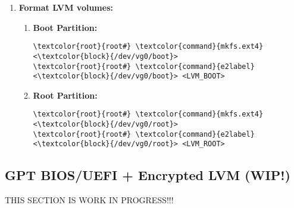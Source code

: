 \documentclass[10pt, a4paper, onecolumn, openany]{book} %
\begin{document}
\begin{enumerate}
\begin{enumerate}
    \item \textbf{Show LVM stuff:}
    \begin{itemize}
        \item \textbf{Physical Volumes:}
\begin{Verbatim}[commandchars=\\\{\}]
\textcolor{root}{root#} \textcolor{command}{lvm} pvdisplay
\end{Verbatim}            
        \item \textbf{Volume Groups:}
\begin{Verbatim}[commandchars=\\\{\}]
\textcolor{root}{root#} \textcolor{command}{lvm} vgdisplay [vg0]
\end{Verbatim}         
        \item \textbf{Logical Volumes:}
\begin{Verbatim}[commandchars=\\\{\}]
\textcolor{root}{root#} \textcolor{command}{lvm} lvdisplay
\end{Verbatim}       
        \end{itemize}
    \end{enumerate}

    \item \textbf{Format LVM volumes:}
    \begin{enumerate}
        \item \textbf{Boot Partition:}
\begin{Verbatim}[commandchars=\\\{\}]
\textcolor{root}{root#} \textcolor{command}{mkfs.ext4} <\textcolor{block}{/dev/vg0/boot}>
\textcolor{root}{root#} \textcolor{command}{e2label} <\textcolor{block}{/dev/vg0/boot}> <LVM_BOOT>
\end{Verbatim}        
        \item \textbf{Root Partition:}
\begin{Verbatim}[commandchars=\\\{\}]
\textcolor{root}{root#} \textcolor{command}{mkfs.ext4} <\textcolor{block}{/dev/vg0/root}>
\textcolor{root}{root#} \textcolor{command}{e2label} <\textcolor{block}{/dev/vg0/root}> <LVM_ROOT>
\end{Verbatim}  
    \end{enumerate}
    
\end{enumerate}
\subsection{GPT BIOS/UEFI + Encrypted LVM (WIP!)}
THIS SECTION IS WORK IN PROGRESS!!!
\end{document}
